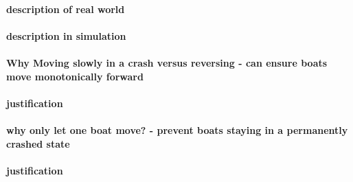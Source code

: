         \paragraph{description of real world}
        \paragraph{description in simulation}
        \paragraph{Why Moving slowly in a crash versus reversing - can ensure boats move monotonically forward}
        \paragraph{justification}
        \paragraph{why only let one boat move? - prevent boats staying in a permanently crashed state}
        \paragraph{justification}
  

